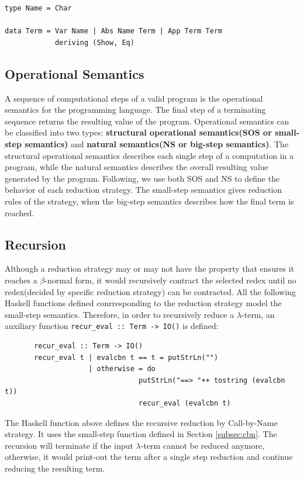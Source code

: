 \documentclass[a4paper,11pt,twoside]{report}
\begin{document}
\begin{verbatim}
type Name = Char  

data Term = Var Name | Abs Name Term | App Term Term
            deriving (Show, Eq)
\end{verbatim}


\subsection*{Operational Semantics}

A sequence of computational steps of a valid program is the operational semantics for the programming language. The final step of a terminating sequence returns the resulting value of the program. Operational semantics can be classified into two types: \textbf{structural operational semantics(SOS or small-step semantics)} and \textbf{natural semantics(NS or big-step semantics)}. The structural operational semantics describes each single step of a computation in a program, while the natural semantics describes the overall resulting value generated by the program. Following, we use both SOS and NS to define the behavior of each reduction strategy. The small-step semantics gives reduction rules of the strategy, when the big-step semantics describes how the final term is reached.  

\subsection*{Recursion}

Although a reduction strategy may or may not have the property that ensures it reaches a $\beta$-normal form, it would recursively contract the selected redex until no redex(decided by specific reduction strategy) can be contracted. All the following Haskell functions defined conrresponding to the reduction strategy model the small-step semantics. Therefore, in order to recursively reduce a $\lambda$-term, an auxiliary function \verb|recur_eval :: Term -> IO()| is defined:

\begin{verbatim}
       recur_eval :: Term -> IO()
       recur_eval t | evalcbn t == t = putStrLn("")
                    | otherwise = do
                                putStrLn("==> "++ tostring (evalcbn t))
                                recur_eval (evalcbn t)
\end{verbatim}

The Haskell function above defines the recursive reduction by Call-by-Name strategy. It uses the small-step function defined in Section \ref{subsec:cbn}. The recursion will terminate if the input $\lambda$-term cannot be reduced anymore, otherwise, it would print-out the term after a single step reduction and continue reducing the resulting term.
\end{document}

